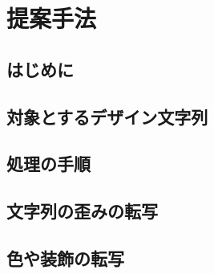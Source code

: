 \documentclass[\homedir/main.tex]{subfiles}
\begin{document}
\setcounter{chapter}{3}
\chapter{提案手法}\label{sec:methods}
\section{はじめに}
\section{対象とするデザイン文字列}

\section{処理の手順}

\section{文字列の歪みの転写}

\section{色や装飾の転写}
\end{document}
